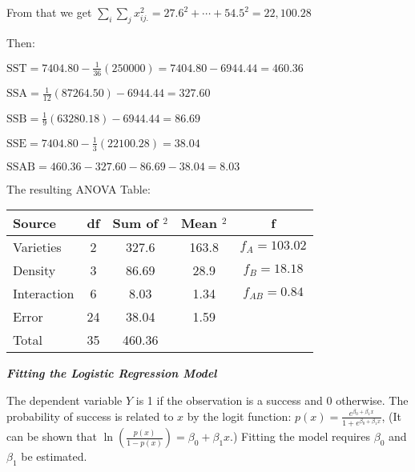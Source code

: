 \documentclass{article}
\newcommand{\smalltitle}[1]{
	\noindent
	\textbf{\textit{#1}}
}
\begin{document}
	
	From that we get $\sum _ { i } \sum _ { j } x _ { i j . } ^ { 2 } = 27.6 ^ { 2 } + \cdots + 54.5 ^ { 2 } = 22,100.28$
	
	Then:
	
	\begin{spacing}{1.1}
	
	$\mathrm { SST } = 7404.80 - \frac { 1 } { 36 } ( 250000 ) = 7404.80 - 6944.44 = 460.36$
	
	$\mathrm { SSA } = \frac { 1 } { 12 } ( 87264.50 ) - 6944.44 = 327.60$
	
	$\mathrm { SSB } = \frac { 1 } { 9 } ( 63280.18 ) - 6944.44 = 86.69$
	
	$\mathrm { SSE } = 7404.80 - \frac { 1 } { 3 } ( 22100.28 ) = 38.04$
	
	$\mathrm { SSAB } = 460.36 - 327.60 - 86.69 - 38.04 = 8.03$
	
	\end{spacing}

	The resulting ANOVA Table:
	
	
	\begin{table}[htb]
		\centering
		\vspace{-0.8em}
		\begin{tabular}{lcccc}
			Source      & df & Sum of $^2$ & Mean $^2$ & f               \\\hline
			Varieties   & 2  & 327.6       & 163.8     & $f_A = 103.02$  \\
			Density     & 3  & 86.69       & 28.9      & $f_B = 18.18$   \\
			Interaction & 6  & 8.03        & 1.34      & $f_{AB} = 0.84$ \\
			Error       & 24 & 38.04       & 1.59      &                 \\
			Total       & 35 & 460.36      &           &                
		\end{tabular}
		\vspace{-0.8em}
	\end{table}
	

	\smalltitle{Fitting the Logistic Regression Model}
	
	The dependent variable $Y$ is 1 if the observation is a success and 0 otherwise. The probability of success is related to $x$ by the logit function: $p ( x ) = \frac { e ^ { \beta _ { 0 } + \beta _ { 1 } x } } { 1 + e ^ { \beta _ { 0 } + \beta _ { 1 } x } }$, 
	(It can be shown that $\ln \left( \frac { p ( x ) } { 1 - p ( x ) } \right) = \beta _ { 0 } + \beta _ { 1 } x$.)
	Fitting the model requires $\beta_0$ and $\beta_1$ be estimated.
	
\end{document}
